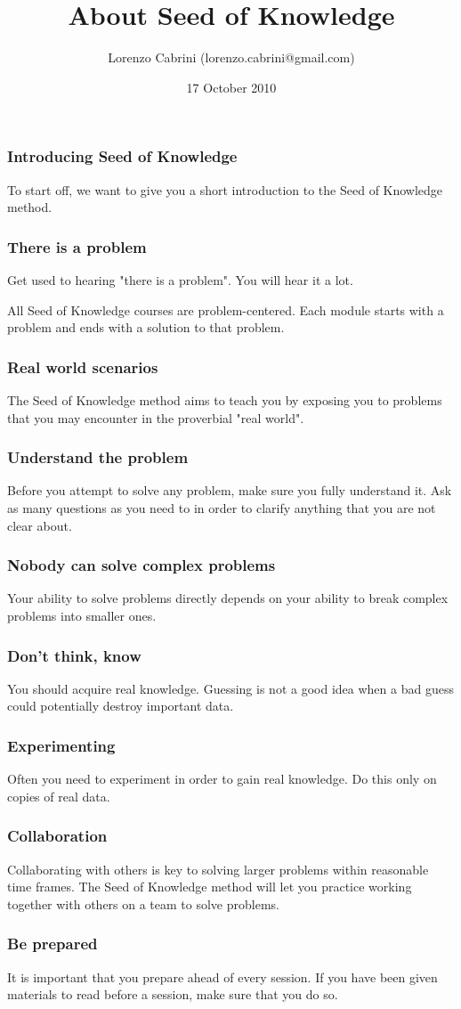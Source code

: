 \documentclass{beamer}
\title{About Seed of Knowledge}
\author{Lorenzo Cabrini (lorenzo.cabrini@gmail.com)}
\date{17 October 2010}
\begin{document}
\frame{\titlepage}

\begin{frame}
\frametitle{Introducing Seed of Knowledge}
To start off, we want to give you a short introduction to the Seed of Knowledge method.
\end{frame}

\begin{frame}
\frametitle{There is a problem}
Get used to hearing "there is a problem". You will hear it a lot.

All Seed of Knowledge courses are problem-centered. Each module starts with a problem and ends with a solution to that problem.
\end{frame}

\begin{frame}
\frametitle{Real world scenarios}
The Seed of Knowledge method aims to teach you by exposing you to problems that you may encounter in the proverbial "real world".
\end{frame}

\begin{frame}
\frametitle{Understand the problem}
Before you attempt to solve any problem, make sure you fully understand it. Ask as many questions as you need to in order to clarify anything that you are not clear about.
\end{frame}

\begin{frame}
\frametitle{Nobody can solve complex problems}
Your ability to solve problems directly depends on your ability to break complex problems into smaller ones.
\end{frame}

\begin{frame}
\frametitle{Don't think, know}
You should acquire real knowledge. Guessing is not a good idea when a bad guess could potentially destroy important data.
\end{frame}

\begin{frame}
\frametitle{Experimenting}
Often you need to experiment in order to gain real knowledge. Do this only on copies of real data.
\end{frame}

\begin{frame}
\frametitle{Collaboration}
Collaborating with others is key to solving larger problems within reasonable time frames. The Seed of Knowledge method will let you practice working together with others on a team to solve problems.
\end{frame}

\begin{frame}
\frametitle{Be prepared}
It is important that you prepare ahead of every session. If you have been given materials to read before a session, make sure that you do so. 
\end{frame}
\end{document}

